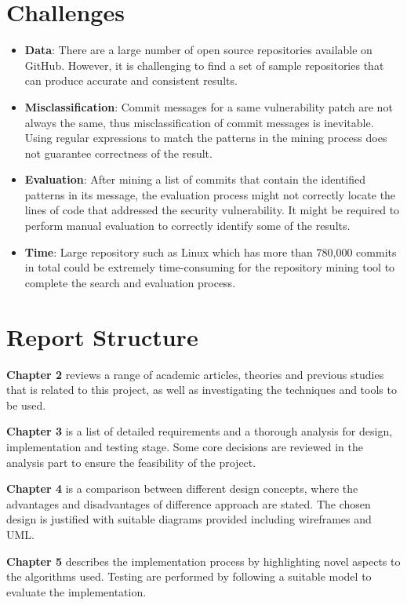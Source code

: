 \documentclass[12pt, a4paper]{report}
\begin{document}
\section{Challenges} \label{sec:challenges}
\begin{itemize}
	\item \textbf{Data}: There are a large number of open source repositories available on GitHub.
	However, it is challenging to find a set of sample repositories that can produce accurate and
	consistent results.
	\item \textbf{Misclassification}: Commit messages for a same vulnerability patch are not always
	the same, thus misclassification of commit messages is inevitable. Using regular expressions to
	match the patterns in the mining process does not guarantee correctness of the result.
	\item \textbf{Evaluation}: After mining a list of commits that contain the identified patterns in
	its message, the evaluation process might not correctly locate the lines of code that addressed
	the security vulnerability. It might be required to perform manual evaluation to correctly
	identify some of the results.
	\item \textbf{Time}: Large repository such as Linux which has more than 780,000 commits in total
	\cite{linux_repo} could be extremely time-consuming for the repository mining tool to complete the
	search and evaluation process.
\end{itemize}

\section{Report Structure}
\textbf{Chapter 2} reviews a range of academic articles, theories and previous studies that
is related to this project, as well as investigating the techniques and tools to be used.

\noindent\textbf{Chapter 3} is a list of detailed requirements and a thorough analysis for design,
implementation and testing stage. Some core decisions are reviewed in the analysis part to ensure
the feasibility of the project.

\noindent\textbf{Chapter 4} is a comparison between different design concepts, where the advantages
and disadvantages of difference approach are stated. The chosen design is justified with suitable
diagrams provided including wireframes and UML.

\noindent\textbf{Chapter 5} describes the implementation process by highlighting novel aspects to
the algorithms used. Testing are performed by following a suitable model to evaluate the
implementation.
\end{document}
